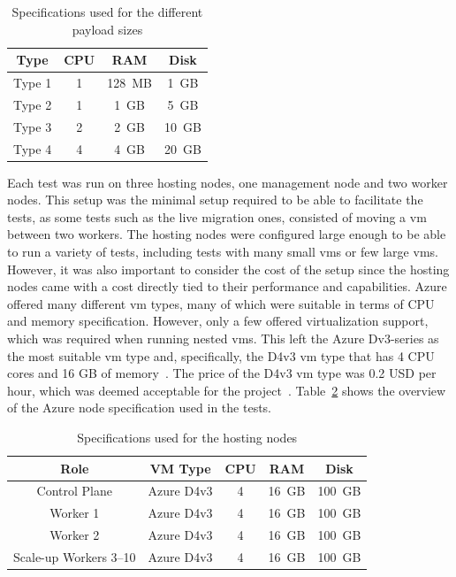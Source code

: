\documentclass{kththesis}
\begin{document}
\begin{table}[!ht]
    \caption{Specifications used for the different payload sizes}
    \centering
    \begin{tabular}{ |c c c c| } 
        \hline
        \textbf{Type} & \textbf{CPU} & \textbf{RAM} & \textbf{Disk}\\ 
        \hline
        \hline
        Type 1 & 1 & 128\ MB & 1\ GB \\
        \hline
        Type 2 & 1 & 1\ GB & 5\ GB \\
        \hline
        Type 3 & 2 & 2\ GB & 10\ GB \\
        \hline
        Type 4 & 4 & 4\ GB & 20\ GB \\
        \hline
    \end{tabular}
    \label{table:vm-specs}
\end{table}

Each test was run on three hosting nodes, one management node and two worker nodes. This setup was the minimal setup required to be able to facilitate the tests, as some tests such as the live migration ones, consisted of moving a \Gls{vm} between two workers. The hosting nodes were configured large enough to be able to run a variety of tests, including tests with many small \Glspl{vm} or few large \Glspl{vm}. However, it was also important to consider the cost of the setup since the hosting nodes came with a cost directly tied to their performance and capabilities. Azure offered many different \Gls{vm} types, many of which were suitable in terms of CPU and memory specification. However, only a few offered virtualization support, which was required when running nested \Glspl{vm}. This left the Azure Dv3-series as the most suitable \Gls{vm} type and, specifically, the D4v3 \Gls{vm} type that has 4 CPU cores and 16 GB of memory\ \cite{azure-dv3-series}. The price of the D4v3 \Gls{vm} type was 0.2 USD per hour, which was deemed acceptable for the project\ \cite{azure-pricing}. Table\ \ref{table:node-specs} shows the overview of the Azure node specification used in the tests.

\begin{table}[!ht]
    \caption{Specifications used for the hosting nodes}
    \centering
    \begin{tabular}{ | c c c c c | }
        \hline
        \textbf{Role} & \textbf{VM Type} & \textbf{CPU} & \textbf{RAM} & \textbf{Disk}\\
        \hline
        \hline
        Control Plane & Azure D4v3 & 4 & 16\ GB & 100\ GB  \\
        \hline
        Worker 1 & Azure D4v3 & 4 & 16\ GB & 100\ GB  \\
        \hline
        Worker 2 & Azure D4v3 & 4 & 16\ GB & 100\ GB  \\
        \hline
        Scale-up Workers 3--10 & Azure D4v3 & 4 & 16\ GB & 100\ GB  \\
        \hline
    \end{tabular}
    \label{table:node-specs}
\end{table}
\end{document}
